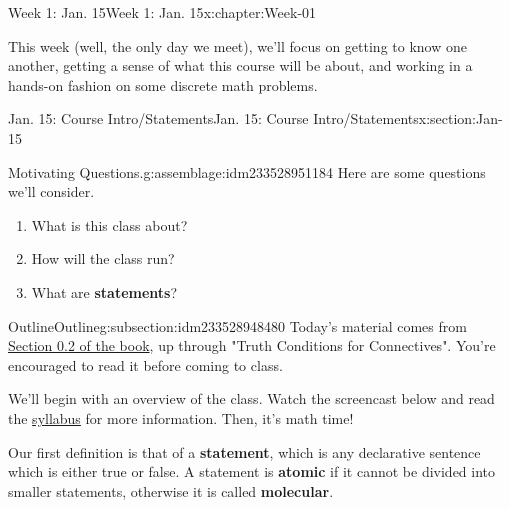 \documentclass[oneside,10pt,]{book}
\newcommand{\terminology}[1]{\textbf{#1}}
\numberwithin{equation}{section}
\begin{document}
\setcounter{tocdepth}{1}
\renewcommand*\contentsname{Contents}
\tableofcontents
\mainmatter
%
%
\typeout{************************************************}
\typeout{************************************************}
%
\begin{chapterptx}{Week 1: Jan. 15}{}{Week 1: Jan. 15}{}{}{x:chapter:Week-01}
\begin{introduction}{}%
This week (well, the only day we meet), we'll focus on getting to know one another, getting a sense of what this course will be about, and working in a hands-on fashion on some discrete math problems.%
\end{introduction}%
%
%
\typeout{************************************************}
\typeout{************************************************}
%
\begin{sectionptx}{Jan. 15: Course Intro\slash{}Statements}{}{Jan. 15: Course Intro\slash{}Statements}{}{}{x:section:Jan-15}
\begin{introduction}{}%
\begin{assemblage}{Motivating Questions.}{g:assemblage:idm233528951184}%
Here are some questions we'll consider. %
\begin{enumerate}
\item{}What is this class about?%
\item{}How will the class run?%
\item{}What are \terminology{statements}?%
\end{enumerate}
%
\end{assemblage}
\end{introduction}%
%
%
\typeout{************************************************}
\typeout{************************************************}
%
\begin{subsectionptx}{Outline}{}{Outline}{}{}{g:subsection:idm233528948480}
Today's material comes from \href{http://discrete.openmathbooks.org/dmoi3/sec_intro-statements.html}{Section 0.2 of the book}, up through "Truth Conditions for Connectives". You're encouraged to read it before coming to class.%
\par
We'll begin with an overview of the class. Watch the screencast below and read the \href{https://prof.mkjanssen.org/ds}{syllabus} for more information. Then, it's math time!%
\par
{} Our first definition is that of a \terminology{statement}, which is any declarative sentence which is either true or false. A statement is \terminology{atomic} if it cannot be divided into smaller statements, otherwise it is called \terminology{molecular}.%

\end{subsectionptx}
\end{sectionptx}
\end{chapterptx}
\end{document}
